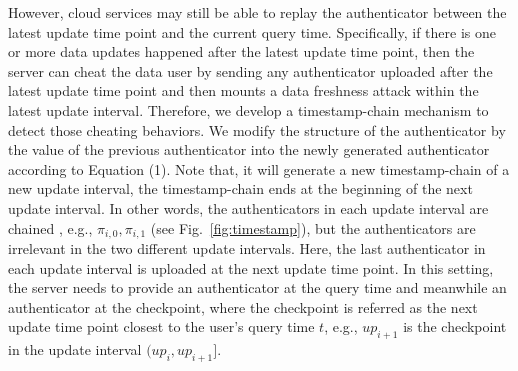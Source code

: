 However, cloud services may still be able to replay the authenticator between the latest update time point and the current query time. Specifically, if there is one or more data updates happened after the latest update time point, then the server can cheat the data user by sending any authenticator uploaded after the latest update time point and then mounts a data freshness attack within the latest update interval.
Therefore, we develop a timestamp-chain mechanism to detect those cheating behaviors. We modify the structure of the authenticator by  the value of the previous authenticator into the newly generated authenticator according to Equation (1). Note that, it will generate a new timestamp-chain of a new update interval,  the timestamp-chain ends at the beginning of the next update interval. In other words, the authenticators in each update interval are chained , e.g., $\pi_{i, 0}, \pi_{i, 1}$ (see Fig.~\ref{fig:timestamp}), but the authenticators are irrelevant in the two different update intervals. Here, the last authenticator in each update interval is uploaded at the next update time point. In this setting, the server needs to provide an authenticator at the query time and meanwhile an authenticator at the checkpoint, where the checkpoint is referred as the next update time point closest to the user's query time $t$, e.g., $up_{i+1}$ is the checkpoint in the update interval $(up_i,up_{i+1}]$.





